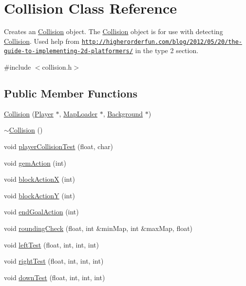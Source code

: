 \hypertarget{class_collision}{\section{Collision Class Reference}
\label{class_collision}
}


Creates an \hyperlink{class_collision}{Collision} object. The \hyperlink{class_collision}{Collision} object is for use with detecting \hyperlink{class_collision}{Collision}. Used help from \href{http://higherorderfun.com/blog/2012/05/20/the-guide-to-implementing-2d-platformers/}{\tt http\+://higherorderfun.\+com/blog/2012/05/20/the-\/guide-\/to-\/implementing-\/2d-\/platformers/} in the type 2 section.  




{\ttfamily \#include $<$collision.\+h$>$}

\subsection*{Public Member Functions}
\begin{DoxyCompactItemize}
\item 
\hyperlink{class_collision_ad31e4037d453108a21fc186cfc27fec9}{Collision} (\hyperlink{class_player}{Player} $\ast$, \hyperlink{class_map_loader}{Map\+Loader} $\ast$, \hyperlink{class_background}{Background} $\ast$)
\item 
\hyperlink{class_collision_a19ae49bcb3b16f4622443a34a171590c}{$\sim$\+Collision} ()
\item 
void \hyperlink{class_collision_a79a33125bb8ef50a883822b4c80b71ae}{player\+Collision\+Test} (float, char)
\item 
void \hyperlink{class_collision_a8a7c7bbaa789c0867559d79ef186dd84}{gem\+Action} (int)
\item 
void \hyperlink{class_collision_a8daccc0201f916f571afbbd8da992ffb}{block\+Action\+X} (int)
\item 
void \hyperlink{class_collision_ac4b2ae74fb5978743580f25ac2760f3a}{block\+Action\+Y} (int)
\item 
void \hyperlink{class_collision_aff0b810980a84e644e531da82487d8c8}{end\+Goal\+Action} (int)
\item 
void \hyperlink{class_collision_a7b13afe2227a341d094d5bcb5e8e4905}{rounding\+Check} (float, int \&min\+Map, int \&max\+Map, float)
\item 
void \hyperlink{class_collision_a0cd628e6adcb69e216f9b469fa7c029c}{left\+Test} (float, int, int, int)
\item 
void \hyperlink{class_collision_a5aff01e79c9c42e7d71a57de7412dc58}{right\+Test} (float, int, int, int)
\item 
void \hyperlink{class_collision_a7c33a20a9c111630eeb8f0202605161e}{down\+Test} (float, int, int, int)
\end{DoxyCompactItemize}



